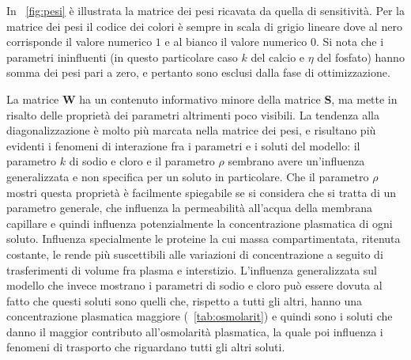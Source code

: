In \figurename~\ref{fig:pesi} è illustrata la matrice dei pesi ricavata da quella di sensitività. Per la matrice dei pesi il codice dei colori è sempre in scala di grigio lineare dove al nero corrisponde il valore numerico $1$ e al bianco il valore numerico $0$. Si nota che i parametri ininfluenti (in questo particolare caso $k$ del calcio e $\eta$ del fosfato) hanno somma dei pesi pari a zero, e pertanto sono esclusi dalla fase di ottimizzazione.

La matrice \textbf{W} ha un contenuto informativo minore della matrice \textbf{S}, ma mette in risalto delle proprietà dei parametri altrimenti poco visibili. La tendenza alla diagonalizzazione è molto più marcata nella matrice dei pesi, e risultano più evidenti i fenomeni di interazione fra i parametri e i soluti del modello: il parametro $k$ di sodio e cloro e il parametro $\rho$ sembrano avere un'influenza generalizzata e non specifica per un soluto in particolare. Che il parametro $\rho$ mostri questa proprietà è facilmente spiegabile se si considera che si tratta di un parametro generale, che influenza la permeabilità all'acqua della membrana capillare e quindi influenza potenzialmente la concentrazione plasmatica di ogni soluto. Influenza specialmente le proteine la cui massa compartimentata, ritenuta costante, le rende più suscettibili alle variazioni di concentrazione a seguito di trasferimenti di volume fra plasma e interstizio. L'influenza generalizzata sul modello che invece mostrano i parametri di sodio e cloro può essere dovuta al fatto che questi soluti sono quelli che, rispetto a tutti gli altri, hanno una concentrazione plasmatica maggiore (\tablename~\ref{tab:osmolarit}) e quindi sono i soluti che danno il maggior contributo all'osmolarità plasmatica, la quale poi influenza i fenomeni di trasporto che riguardano tutti gli altri soluti.